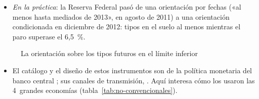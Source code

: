 \documentclass[11pt]{article}
\begin{document}
\begin{itemize}
  \begin{itemize}
  \item entre $t_0$ y $T$ el tipo natural es negativo y el nominal está en cero, por encima de lo que la economía necesitaría;
  \item sin orientación, el banco central sube el tipo en cuanto el tipo natural vuelve a ser positivo, en $T$;
  \item con orientación, promete mantenerlo en cero hasta $T+1$ y tolerar entonces una expansión con algo de inflación; al anticiparla, los hogares esperan más inflación y más renta durante la crisis, y el tipo real baja sin que el nominal se mueva.
  \end{itemize}
\item \emph{En la práctica}: la Reserva Federal pasó de una orientación por fechas («al menos hasta mediados de 2013», en agosto de 2011) a una orientación condicionada en diciembre de 2012: tipos en el suelo al menos mientras el paro superase el 6,5~\%\nocite{Bernanke2020New}.
\end{itemize}

\begin{figure}[H]
\centering
\caption{La orientación sobre los tipos futuros en el límite inferior}\label{fig:orientacion-tipos}
\end{figure}

\begin{itemize}
\item El catálogo y el diseño de estos instrumentos son de la política monetaria del banco central ; sus canales de transmisión, . Aquí interesa cómo los usaron las 4~grandes economías (tabla~\ref{tab:no-convencionales}).
\end{itemize}
\end{document}
